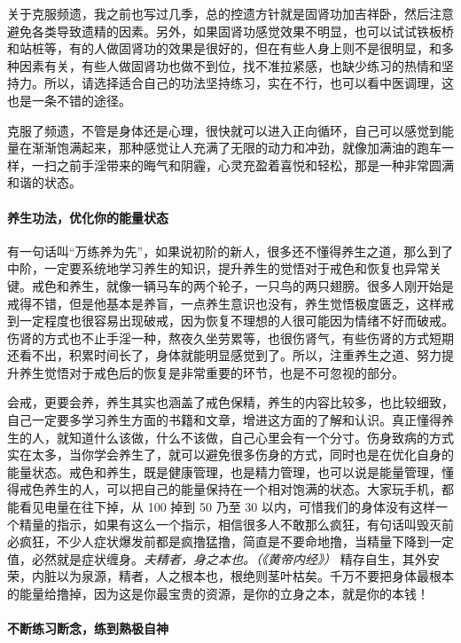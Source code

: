 关于克服频遗，我之前也写过几季，总的控遗方针就是固肾功加吉祥卧，然后注意避免各类导致遗精的因素。另外，如果固肾功感觉效果不明显，也可以试试铁板桥和站桩等，有的人做固肾功的效果是很好的，但在有些人身上则不是很明显，和多种因素有关，有些人做固肾功也做不到位，找不准拉紧感，也缺少练习的热情和坚持力。所以，请选择适合自己的功法坚持练习，实在不行，也可以看中医调理，这也是一条不错的途径。

克服了频遗，不管是身体还是心理，很快就可以进入正向循环，自己可以感觉到能量在渐渐饱满起来，那种感觉让人充满了无限的动力和冲劲，就像加满油的跑车一样，一扫之前手淫带来的晦气和阴霾，心灵充盈着喜悦和轻松，那是一种非常圆满和谐的状态。

\paragraph{养生功法，优化你的能量状态}

有一句话叫“万练养为先”，如果说初阶的新人，很多还不懂得养生之道，那么到了中阶，一定要系统地学习养生的知识，提升养生的觉悟对于戒色和恢复也异常关键。戒色和养生，就像一辆马车的两个轮子，一只鸟的两只翅膀。很多人刚开始是戒得不错，但是他基本是养盲，一点养生意识也没有，养生觉悟极度匮乏，这样戒到一定程度也很容易出现破戒，因为恢复不理想的人很可能因为情绪不好而破戒。伤肾的方式也不止手淫一种，熬夜久坐劳累等，也很伤肾气，有些伤肾的方式短期还看不出，积累时间长了，身体就能明显感觉到了。所以，注重养生之道、努力提升养生觉悟对于戒色后的恢复是非常重要的环节，也是不可忽视的部分。

会戒，更要会养，养生其实也涵盖了戒色保精，养生的内容比较多，也比较细致，自己一定要多学习养生方面的书籍和文章，增进这方面的了解和认识。真正懂得养生的人，就知道什么该做，什么不该做，自己心里会有一个分寸。伤身致病的方式实在太多，当你学会养生了，就可以避免很多伤身的方式，同时也是在优化自身的能量状态。戒色和养生，既是健康管理，也是精力管理，也可以说是能量管理，懂得戒色养生的人，可以把自己的能量保持在一个相对饱满的状态。大家玩手机，都能看见电量在往下掉，从 100 掉到 50 乃至 30 以内，可惜我们的身体没有这样一个精量的指示，如果有这么一个指示，相信很多人不敢那么疯狂，有句话叫毁灭前必疯狂，不少人症状爆发前都是疯撸猛撸，简直是不要命地撸，当精量下降到一定值，必然就是症状缠身。\textit{夫精者，身之本也。（《黄帝内经》）} 精存自生，其外安荣，内脏以为泉源，精者，人之根本也，根绝则茎叶枯矣。千万不要把身体最根本的能量给撸掉，因为这是你最宝贵的资源，是你的立身之本，就是你的本钱！

\paragraph{不断练习断念，练到熟极自神}


